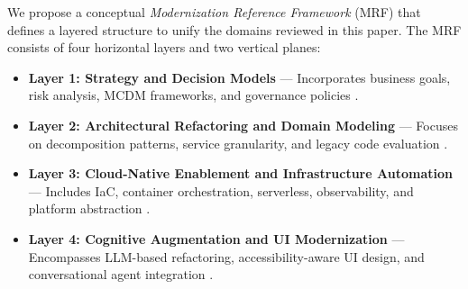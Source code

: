 \documentclass[12pt]{article}
\begin{document}
We propose a conceptual \textit{Modernization Reference Framework} (MRF) that defines a layered structure to unify the domains reviewed in this paper. The MRF consists of four horizontal layers and two vertical planes:

\begin{itemize}
    \item \textbf{Layer 1: Strategy and Decision Models} — Incorporates business goals, risk analysis, MCDM frameworks, and governance policies \cite{assuncao2025, ogunwole2023}.
    \item \textbf{Layer 2: Architectural Refactoring and Domain Modeling} — Focuses on decomposition patterns, service granularity, and legacy code evaluation \cite{lenarduzzi2020, wolfart2021}.
    \item \textbf{Layer 3: Cloud-Native Enablement and Infrastructure Automation} — Includes IaC, container orchestration, serverless, observability, and platform abstraction \cite{fahmideh2019, yousef2024}.
    \item \textbf{Layer 4: Cognitive Augmentation and UI Modernization} — Encompasses LLM-based refactoring, accessibility-aware UI design, and conversational agent integration \cite{zhao2024uxagent, liu2024crowdgenui}.
\end{itemize}

\usepackage{tikz}
\usetikzlibrary{positioning, shapes.multipart, fit, arrows.meta}
\end{document}
